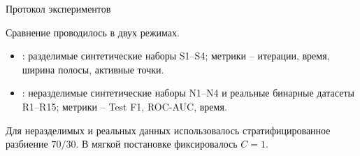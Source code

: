 \SPBGContentSlide
  {Протокол экспериментов}
  {%
    \Body
    Сравнение проводилось в двух режимах.

    \vspace{.25cm}
    \begin{itemize}
      \item {}: разделимые синтетические наборы S1--S4;
      метрики -- итерации, время, ширина полосы, активные точки.
      \item {}: неразделимые синтетические наборы N1--N4
      и реальные бинарные датасеты R1--R15;
      метрики -- Test F1, ROC-AUC, время.
    \end{itemize}

    \vspace{.25cm}
    Для неразделимых и реальных данных использовалось стратифицированное
    разбиение $70/30$. В мягкой постановке фиксировалось $C=1$.
  }
